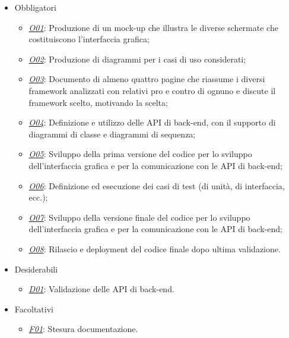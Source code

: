 \begin{itemize}
	\item Obbligatori
	\begin{itemize}
		\item \underline{\textit{O01}}: Produzione di un mock-up che illustra le diverse schermate che costituiscono l'interfaccia grafica;
	 \item \underline{\textit{O02}}: Produzione di diagrammi per i casi di uso considerati;
	\item \underline{\textit{O03}}: Documento di almeno quattro pagine che riassume i diversi framework analizzati con relativi pro e contro di ognuno e discute il framework scelto, motivando la scelta;
	 \item \underline{\textit{O04}}: Definizione e utilizzo delle \gls{API} di back-end, con il supporto di diagrammi di classe e diagrammi di sequenza;
\item \underline{\textit{O05}}: Sviluppo della prima versione del codice per lo sviluppo dell'interfaccia grafica e per la comunicazione con le \gls{API} di back-end;
\item \underline{\textit{O06}}: Definizione ed esecuzione dei casi di test (di unità, di interfaccia, ecc.);
\item \underline{\textit{O07}}: Sviluppo della versione finale del codice per lo sviluppo dell'interfaccia grafica e per la comunicazione con le \gls{API} di back-end;
\item \underline{\textit{O08}}: Rilascio e deployment del codice finale dopo ultima validazione.
	\end{itemize}
	
	\item Desiderabili 
	\begin{itemize}
		\item \underline{\textit{D01}}: Validazione delle \gls{API} di back-end. 
	\end{itemize}
	
	\item Facoltativi
	\begin{itemize}
		\item \underline{\textit{F01}}: Stesura documentazione.
	\end{itemize} 
\end{itemize}


\clearpage

